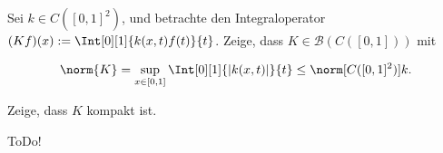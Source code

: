 \begin{exercise}[IO/4]

Sei $k \in C([0, 1]^2)$, und betrachte den Integraloperator $(K f)(x) := \Int[0][1]{k(x, t)f(t)}{t}$.
Zeige, dass $K \in \mathcal{B}(C([0, 1]))$ mit

\begin{align*}
  \norm{K}
  =
  \sup_{x \in [0, 1]} \Int[0][1]{|k(x, t)|}{t}
  \leq
  \norm[{C([0, 1]^2)}]{k}.
\end{align*}

Zeige, dass $K$ kompakt ist.

\end{exercise}

\begin{solution}

ToDo!

\end{solution}
